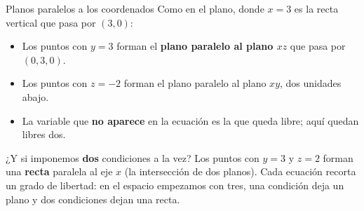 \documentclass[aspectratio=169,10pt]{beamer}
\newcommand{\destaca}[1]{%
  \par\vspace{3pt}\noindent
  \colorbox{turquesaClaro}{%
    \parbox{\dimexpr\linewidth-2\fboxsep\relax}{\vspace{3pt}#1\vspace{3pt}}}%
  \par\vspace{3pt}}
\begin{document}
\begin{frame}{Planos paralelos a los coordenados}
  Como en el plano, donde $x=3$ es la recta vertical que pasa por
  $(3,0)$:

  \vspace{0.2cm}
  \begin{itemize}
    \item Los puntos con $y=3$ forman el \textbf{plano paralelo al
      plano $xz$} que pasa por $(0,3,0)$.
    \item Los puntos con $z=-2$ forman el plano paralelo al plano
      $xy$, dos unidades abajo.
    \item La variable que \textbf{no aparece} en la ecuación es la
      que queda libre; aquí quedan libres dos.
  \end{itemize}

  \vspace{0.3cm}
  \destaca{¿Y si imponemos \textbf{dos} condiciones a la vez? Los
  puntos con $y=3$ y $z=2$ forman una \textbf{recta} paralela al eje
  $x$ (la intersección de dos planos). Cada ecuación recorta un grado
  de libertad: en el espacio empezamos con tres, una condición deja
  un plano y dos condiciones dejan una recta.}
\end{frame}
\end{document}
